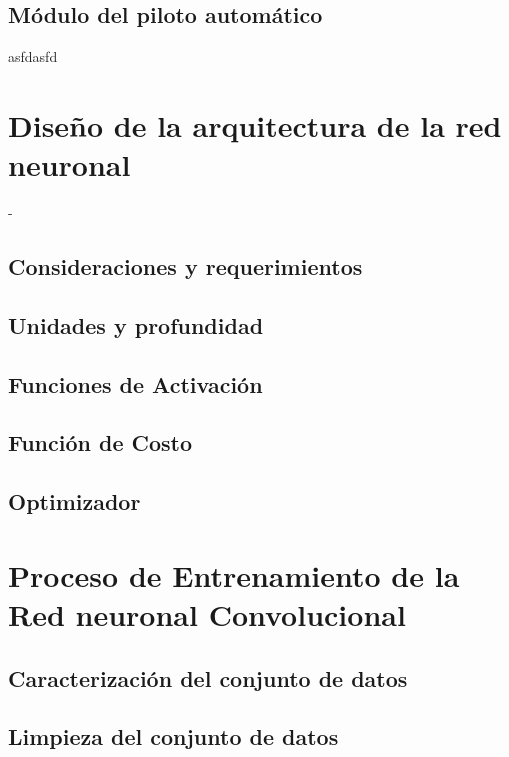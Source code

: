     \subsection{Módulo del piloto automático}
    asfdasfd
\section{Diseño de la arquitectura de la red neuronal}
-
    \subsection{Consideraciones y requerimientos}
    \subsection{Unidades y profundidad}
    \subsection{Funciones de Activación}
    \subsection{Función de Costo}
    \subsection{Optimizador}
    
\section{Proceso de Entrenamiento de la \\ Red neuronal Convolucional} \label{sec:training}
    \subsection{Caracterización del conjunto de datos}
    \subsection{Limpieza del conjunto de datos}
    \subsection{}
